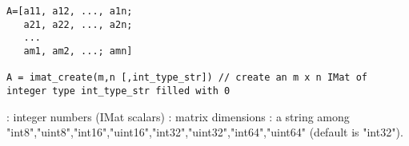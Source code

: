 
\begin{mandesc}
\end{mandesc}
\begin{calling_sequence}
\begin{verbatim}
A=[a11, a12, ..., a1n;
   a21, a22, ..., a2n;
   ...
   am1, am2, ...; amn]

A = imat_create(m,n [,int_type_str]) // create an m x n IMat of integer type int_type_str filled with 0
\end{verbatim}
\end{calling_sequence}
\begin{parameters}
  \begin{varlist}
    : integer numbers (IMat scalars)
    : matrix dimensions
    : a string among  "int8","uint8","int16","uint16","int32","uint32","int64","uint64"
         (default is "int32").
  \end{varlist}
\end{parameters}

